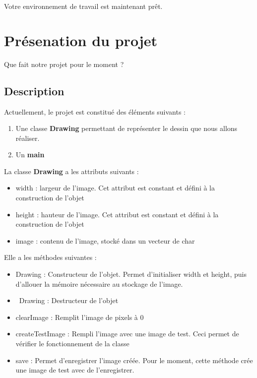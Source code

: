 \documentclass[
	12pt, %
]{fphw}
\begin{document}
Votre environnement de travail est maintenant prêt.


\section*{Présenation du projet}

\begin{problem}
	Que fait notre projet pour le moment ?
\end{problem}


\subsection*{Description}

Actuellement, le projet est constitué des éléments suivants :
\begin{enumerate}
	\item Une classe \textbf{Drawing} permettant de représenter le dessin que nous allons réaliser.
	\item Un \textbf{main}
\end{enumerate}

La classe \textbf{Drawing} a les attributs suivants :
\begin{itemize}
	\item width : largeur de l'image. Cet attribut est constant et défini à la construction de l'objet
	\item height : hauteur de l'image. Cet attribut est constant et défini à la construction de l'objet
	\item image : contenu de l'image, stocké dans un vecteur de char
\end{itemize}

Elle a les méthodes suivantes :
\begin{itemize}
	\item Drawing : Constructeur de l'objet. Permet d'initialiser width et height, puis d'allouer la mémoire nécessaire au stockage de l'image.
	\item ~Drawing : Destructeur de l'objet
	\item clearImage : Remplit l'image de pixels à 0
	\item createTestImage : Rempli l'image avec une image de test. Ceci permet de vérifier le fonctionnement de la classe
	\item save : Permet d'enregistrer l'image créée. Pour le moment, cette méthode crée une image de test avec de l'enregistrer.
\end{itemize}
\end{document}
